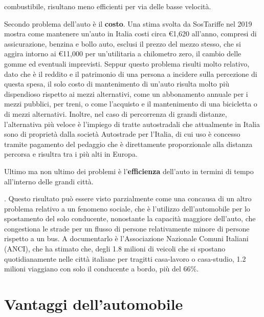 combustibile, risultano meno efficienti per via delle basse velocità.

Secondo problema dell'auto è il \textbf{costo}. Una stima svolta da SosTariffe nel 2019 mostra come mantenere un'auto in Italia costi circa €1,620 all'anno, compresi di assicurazione, benzina e bollo auto, esclusi il prezzo del mezzo stesso, che si aggira intorno ai €11,000 per un'utilitaria a chilometro zero, il cambio delle gomme ed eventuali imprevisti\cite{sostariffe}. Seppur questo problema risulti molto relativo, dato che è il reddito e il patrimonio di una persona a incidere sulla percezione di questa spesa, il solo costo di mantenimento di un'auto risulta molto più dispendioso rispetto ai mezzi alternativi, come un abbonamento annuale per i mezzi pubblici, per treni, o come l'acquisto e il mantenimento di una bicicletta o di mezzi alternativi. Inoltre, nel caso di percorrenza di grandi distanze, l'alternativa più veloce è l'impiego di tratte autostradali che attualmente in Italia sono di proprietà dalla società Autostrade per l'Italia, di cui uso è concesso tramite pagamento del pedaggio che è direttamente proporzionale alla distanza percorsa e risultra tra i più alti in Europa.

Ultimo ma non ultimo dei problemi è l'\textbf{efficienza} dell'auto in termini di tempo all'interno delle grandi città. 


. Questo risultato può essere visto parzialmente come una concausa di un altro problema relativo a un fenomeno sociale, che è l'utilizzo dell'automobile per lo spostamento del solo conducente, nonostante la capacità maggiore dell'auto, che congestiona le strade per un flusso di persone relativamente minore di persone rispetto a un bus. A documentarlo è l'Associazione Nazionale Comuni Italiani (ANCI), che ha stimato che, degli 1.8 milioni di veicoli che si spostano quotidianamente nelle città italiane per tragitti casa-lavoro o casa-studio, 1.2 milioni viaggiano con solo il conducente a bordo\cite{anciperrepubblica}, più del 66\%.

\section{Vantaggi dell'automobile}

